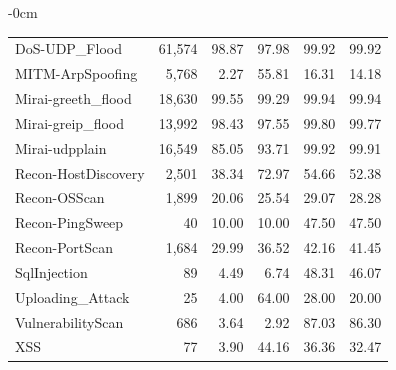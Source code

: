 \begin{table}[!htbp]
\begin{adjustwidth}{-\extralength}{0cm}
\begin{tabular}{lrrrrr}
DoS-UDP\_Flood & 61,574 & 98.87 & 97.98 & 99.92 & 99.92\\
MITM-ArpSpoofing & 5,768 & 2.27 & 55.81 & 16.31 & 14.18\\
Mirai-greeth\_flood & 18,630 & 99.55 & 99.29 & 99.94 & 99.94\\
Mirai-greip\_flood & 13,992 & 98.43 & 97.55 & 99.80 & 99.77\\
Mirai-udpplain & 16,549 & 85.05 & 93.71 & 99.92 & 99.91\\
Recon-HostDiscovery & 2,501 & 38.34 & 72.97 & 54.66 & 52.38\\
Recon-OSScan & 1,899 & 20.06 & 25.54 & 29.07 & 28.28\\
Recon-PingSweep & 40 & 10.00 & 10.00 & 47.50 & 47.50\\
Recon-PortScan & 1,684 & 29.99 & 36.52 & 42.16 & 41.45\\
SqlInjection & 89 & 4.49 & 6.74 & 48.31 & 46.07\\
Uploading\_Attack & 25 & 4.00 & 64.00 & 28.00 & 20.00\\
VulnerabilityScan & 686 & 3.64 & 2.92 & 87.03 & 86.30\\
XSS & 77 & 3.90 & 44.16 & 36.36 & 32.47\\
\bottomrule\end{tabular}
\end{adjustwidth}
\end{table}
